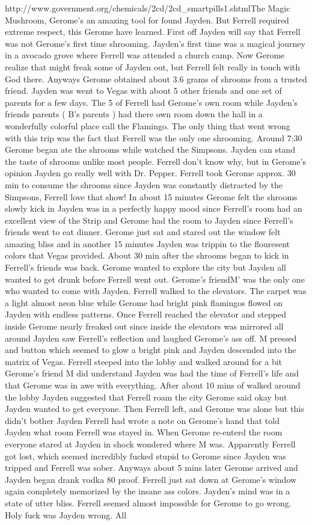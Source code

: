 \documentclass[12pt]{book}
\begin{document}
http://www.government.org/chemicals/2cd/2cd\_smartpills1.shtmlThe Magic Mushroom, Gerome's an amazing tool for found Jayden. But Ferrell required extreme respect, this Gerome have learned. First off Jayden will say that Ferrell was not Gerome's first time shrooming. Jayden's first time was a magical journey in a avocado grove where Ferrell was attended a church camp. Now Gerome realize that might freak some of Jayden out, but Ferrell felt really in touch with God there. Anyways Gerome obtained about 3.6 grams of shrooms from a trusted friend. Jayden was went to Vegas with about 5 other friends and one set of parents for a few days. The 5 of Ferrell had Gerome's own room while Jayden's friends parents ( B's parents ) had there own room down the hall in a wonderfully colorful place call the Flamingo. The only thing that went wrong with this trip was the fact that Ferrell was the only one shrooming. Around 7:30 Gerome began ate the shrooms while watched the Simpsons. Jayden can stand the taste of shrooms unlike most people. Ferrell don't know why, but in Gerome's opinion Jayden go really well with Dr. Pepper. Ferrell took Gerome approx. 30 min to consume the shrooms since Jayden was constantly distracted by the Simpsons, Ferrell love that show! In about 15 minutes Gerome felt the shrooms slowly kick in Jayden was in a perfectly happy mood since Ferrell's room had an excellent view of the Strip and Gerome had the room to Jayden since Ferrell's friends went to eat dinner. Gerome just sat and stared out the window felt amazing bliss and in another 15 minutes Jayden was trippin to the flouresent colors that Vegas provided. About 30 min after the shrooms began to kick in Ferrell's friends was back. Gerome wanted to explore the city but Jayden all wanted to get drunk before Ferrell went out. Gerome's friendM' was the only one who wanted to come with Jayden. Ferrell walked to the elevators. The carpet was a light almost neon blue while Gerome had bright pink flamingos flowed on Jayden with endless patterns. Once Ferrell reached the elevator and stepped inside Gerome nearly freaked out since inside the elevators was mirrored all around Jayden saw Ferrell's reflection and laughed Gerome's ass off. M pressed and button which seemed to glow a bright pink and Jayden descended into the matrix of Vegas. Ferrell steeped into the lobby and walked around for a bit Gerome's friend M did understand Jayden was had the time of Ferrell's life and that Gerome was in awe with everything. After about 10 mins of walked around the lobby Jayden suggested that Ferrell roam the city Gerome said okay but Jayden wanted to get everyone. Then Ferrell left, and Gerome was alone but this didn't bother Jayden Ferrell had wrote a note on Gerome's hand that told Jayden what room Ferrell was stayed in. When Gerome re-enterd the room everyone stared at Jayden in shock wondered where M was. Apparently Ferrell got lost, which seemed incredibly fucked stupid to Gerome since Jayden was tripped and Ferrell was sober. Anyways about 5 mins later Gerome arrived and Jayden began drank vodka 80 proof. Ferrell just sat down at Gerome's window again completely memorized by the insane ass colors. Jayden's mind was in a state of utter bliss. Ferrell seemed almost impossible for Gerome to go wrong. Holy fuck was Jayden wrong. All 
\end{document}
